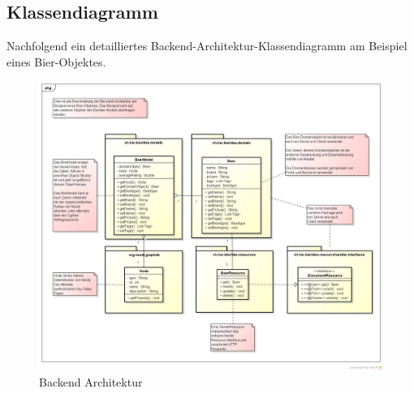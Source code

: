 \documentclass[10pt,a4paper]{scrartcl}
\begin{document}
\subsection{Klassendiagramm}

Nachfolgend ein detailliertes Backend-Architektur-Klassendiagramm am Beispiel eines Bier-Objektes.

\begin{figure}[H]
	\includegraphics[height=\textwidth,angle=90]{BackendArchitektur.png}
	\caption{Backend Architektur}
	\label{fig:backend_architecture}
\end{figure}
\end{document}
